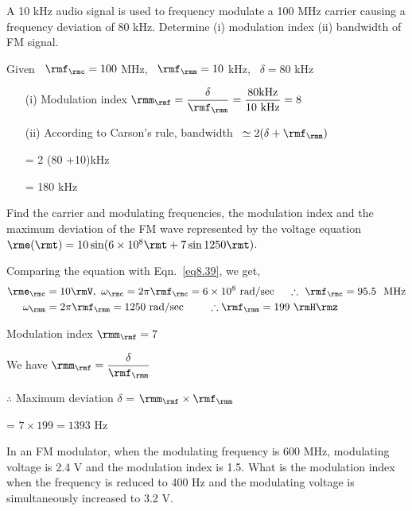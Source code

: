 \begin{problem}\label{prob8.22}
A 10 kHz audio signal is used to frequency modulate a 100 MHz carrier
causing a frequency deviation of 80 kHz. Determine (i) modulation
index (ii) bandwidth of FM signal.
\end{problem}

\begin{solution}
Given ~$\rmf_\rmc = 100$ MHz, ~$\rmf_\rmm = 10$ kHz, ~$\delta =80$ kHz
\begin{itemize}
\item[(i)] Modulation index $\rmm_\rmf
= \dfrac{\delta}{\rmf_\rmm}= \dfrac{80 \text{kHz}}{10\text{ kHz}}=8$

\item[(ii)] According to Carson's rule, bandwidth ~$\simeq 2 (\delta + \rmf_\rmm)$

\hspace{6.1cm} = 2 (80 +10)kHz

\hspace{6.1cm} = 180 kHz
\end{itemize}
\end{solution}

\begin{problem}\label{8.20}
Find the carrier and modulating frequencies, the modulation index and
the maximum deviation of the FM wave represented by the voltage
equation $\rme(\rmt) = 10 \sin (6 \times 10^8 \rmt + 7 \sin 1250 \rmt)$.
\end{problem}

\begin{solution}
Comparing the equation with Eqn.~\eqref{eq8.39}, we get,
\begin{align*}
\rme_\rmc & = 10 \rmV, ~\omega_\rmc = 2 \pi \rmf_\rmc = 6 \times
10^8 \text{ rad/sec }  \quad \therefore ~ \rmf_\rmc = 95.5 ~\text{
MHz} \\
\omega_\rmm & = 2\pi \rmf_\rmm = 1250 \text{ rad/sec } \qquad \therefore \rmf_\rmm = 199 ~\rmH\rmz
\end{align*}

Modulation index $\rmm_\rmf =7$

\smallskip
We have $\rmm_\rmf = \dfrac{\delta}{\rmf_\rmm}$

\smallskip
$\therefore$ Maximum deviation $\delta$ = $\rmm_\rmf \times \rmf_\rmm$

\hspace{3.75cm} = $7 \times 199 = 1393$ Hz
\end{solution}

\begin{problem}\label{prob8.23}
In an FM modulator, when the modulating frequency is 600 MHz,
modulating voltage is 2.4 V and the modulation index is 1.5. What is
the modulation index when the frequency is reduced to 400 Hz and the
modulating voltage is simultaneously increased to 3.2 V.
\end{problem}

